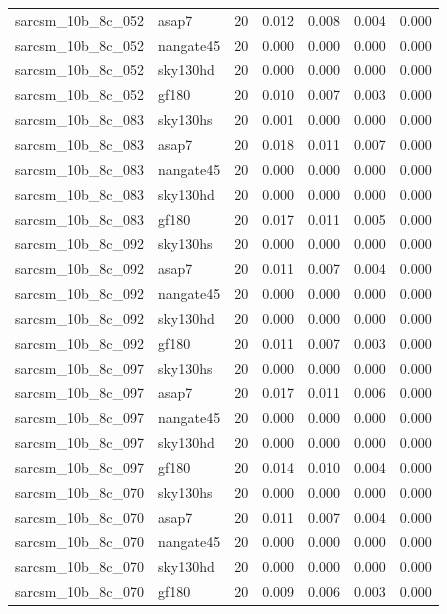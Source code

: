 \begin{tabular}{llrrrrr}
sarcsm\_10b\_8c\_052 & asap7 & 20 & 0.012 & 0.008 & 0.004 & 0.000 \\
sarcsm\_10b\_8c\_052 & nangate45 & 20 & 0.000 & 0.000 & 0.000 & 0.000 \\
sarcsm\_10b\_8c\_052 & sky130hd & 20 & 0.000 & 0.000 & 0.000 & 0.000 \\
sarcsm\_10b\_8c\_052 & gf180 & 20 & 0.010 & 0.007 & 0.003 & 0.000 \\
sarcsm\_10b\_8c\_083 & sky130hs & 20 & 0.001 & 0.000 & 0.000 & 0.000 \\
sarcsm\_10b\_8c\_083 & asap7 & 20 & 0.018 & 0.011 & 0.007 & 0.000 \\
sarcsm\_10b\_8c\_083 & nangate45 & 20 & 0.000 & 0.000 & 0.000 & 0.000 \\
sarcsm\_10b\_8c\_083 & sky130hd & 20 & 0.000 & 0.000 & 0.000 & 0.000 \\
sarcsm\_10b\_8c\_083 & gf180 & 20 & 0.017 & 0.011 & 0.005 & 0.000 \\
sarcsm\_10b\_8c\_092 & sky130hs & 20 & 0.000 & 0.000 & 0.000 & 0.000 \\
sarcsm\_10b\_8c\_092 & asap7 & 20 & 0.011 & 0.007 & 0.004 & 0.000 \\
sarcsm\_10b\_8c\_092 & nangate45 & 20 & 0.000 & 0.000 & 0.000 & 0.000 \\
sarcsm\_10b\_8c\_092 & sky130hd & 20 & 0.000 & 0.000 & 0.000 & 0.000 \\
sarcsm\_10b\_8c\_092 & gf180 & 20 & 0.011 & 0.007 & 0.003 & 0.000 \\
sarcsm\_10b\_8c\_097 & sky130hs & 20 & 0.000 & 0.000 & 0.000 & 0.000 \\
sarcsm\_10b\_8c\_097 & asap7 & 20 & 0.017 & 0.011 & 0.006 & 0.000 \\
sarcsm\_10b\_8c\_097 & nangate45 & 20 & 0.000 & 0.000 & 0.000 & 0.000 \\
sarcsm\_10b\_8c\_097 & sky130hd & 20 & 0.000 & 0.000 & 0.000 & 0.000 \\
sarcsm\_10b\_8c\_097 & gf180 & 20 & 0.014 & 0.010 & 0.004 & 0.000 \\
sarcsm\_10b\_8c\_070 & sky130hs & 20 & 0.000 & 0.000 & 0.000 & 0.000 \\
sarcsm\_10b\_8c\_070 & asap7 & 20 & 0.011 & 0.007 & 0.004 & 0.000 \\
sarcsm\_10b\_8c\_070 & nangate45 & 20 & 0.000 & 0.000 & 0.000 & 0.000 \\
sarcsm\_10b\_8c\_070 & sky130hd & 20 & 0.000 & 0.000 & 0.000 & 0.000 \\
sarcsm\_10b\_8c\_070 & gf180 & 20 & 0.009 & 0.006 & 0.003 & 0.000 \\

\end{tabular}
